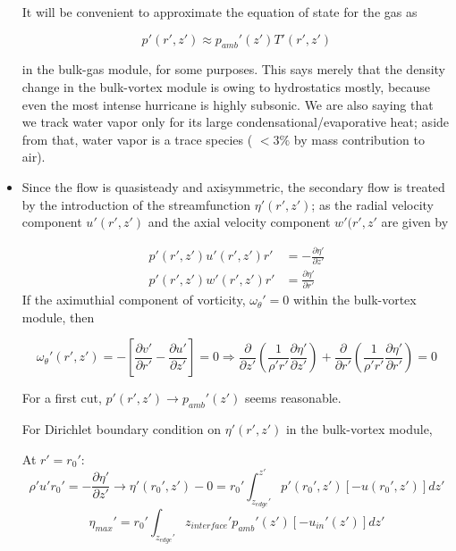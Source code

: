\documentclass[preprint, prX]{revtex4}
\newcommand{\pd}[2]{\frac{\partial#1}{\partial#2}}
\begin{document}
\begin{itemize}
It will be convenient to approximate the equation of state for the gas as 

\begin{equation}
	p'(r',z') \approx p_{amb}'(z') T'(r',z')
\end{equation}

in the bulk-gas module, for some purposes. This says merely that the density change in the bulk-vortex module is owing to hydrostatics mostly, because even the most intense hurricane is highly subsonic. We are also saying that we track water vapor only for its large condensational/evaporative heat; aside from that, water vapor is a trace species ( $<3 \%$ by mass contribution to air).

\item Since the flow is quasisteady and axisymmetric, the secondary flow is treated by the introduction of the streamfunction $\eta'(r',z')$; as the radial velocity component $u'(r',z')$ and the axial velocity component $w'(r',z'$ are given by

\begin{equation}
\begin{split}
	p'(r',z')u'(r',z')r' &= -\pd{ \eta'}{ z'} \\
	p'(r',z')w'(r',z')r' &= \pd{ \eta'}{ r'}
\end{split}
\end{equation}
If the aximuthial component of vorticity, $\omega_\theta' = 0$ within the bulk-vortex module, then

\begin{equation}
	\omega_\theta'(r',z') = - \left [  \pd{ v'}{ r'} - \pd{ u'}{ z'}\right ] = 0 \Rightarrow \pd{}{ z'} \left ( \frac{1}{\rho' r'} \pd{ \eta'}{ z'} \right ) + \pd{}{ r'} \left ( \frac{1}{\rho' r'}\pd{ \eta'}{ r'} \right ) = 0
\end{equation}

For a first cut, $p'(r',z') \rightarrow p_{amb}'(z')$ seems reasonable.

For Dirichlet boundary condition on $\eta ' (r',z')$ in the bulk-vortex module,

\begin{figure}[h!]
	\centering
	\def\svgwidth{0.7\columnwidth}
	
\end{figure}

At $r' = r_0'$:
\begin{equation}
	\rho' u' r_0' = -\pd{ \eta'}{ z'} \rightarrow \eta'(r_0', z') - 0 = r_0' \int_{z_{edge}'}^{z'} p'(r_0', z')[- u(r_0', z')] dz'
\end{equation}
\begin{equation}
	\eta_{max}' = r_0' \int_{z_{edge}'}{z_{interface}'} p_{amb}'(z') [-u_{in}'(z') ] dz'
\end{equation}


\end{itemize}
\end{document}
